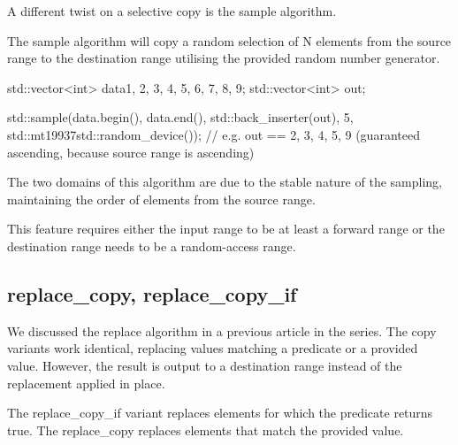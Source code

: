 A different twist on a selective copy is the sample algorithm.



The sample algorithm will copy a random selection of N elements from the source range to the destination range utilising the provided random number generator.

\begin{box-note}
\begin{cppcode}
std::vector<int> data{1, 2, 3, 4, 5, 6, 7, 8, 9};
std::vector<int> out;

std::sample(data.begin(), data.end(), std::back_inserter(out),
            5, std::mt19937{std::random_device{}()});
// e.g. out == {2, 3, 4, 5, 9} (guaranteed ascending, because source range is ascending)
\end{cppcode}
\end{box-note}

The two domains of this algorithm are due to the stable nature of the sampling, maintaining the order of elements from the source range.

This feature requires either the input range to be at least a forward range or the destination range needs to be a random-access range.

\subsection{replace\_copy, replace\_copy\_if}

We discussed the replace algorithm in a previous article in the series. The copy variants work identical, replacing values matching a predicate or a provided value. However, the result is output to a destination range instead of the replacement applied in place.



The replace\_copy\_if variant replaces elements for which the predicate returns true. The replace\_copy replaces elements that match the provided value.

\begin{box-note}
\end{box-note}

